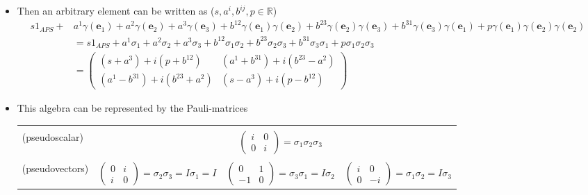 \documentclass[../main.tex]{subfiles}
\begin{document}
\begin{itemize}
\begin{itemize}
\begin{align}
\begin{matrix}
\end{matrix}\right\}\rightarrow\text{Cl}(\textcolor{blue}{0},\textcolor{red}{3})
\end{align}
\item Then an arbitrary element can be written as ($s,a^i,b^{ij},p\in\mathbb{R}$)
\begin{align}
s1_{APS}+&a^1\gamma(\mathbf{e}_1)+a^2\gamma(\mathbf{e}_2)+a^3\gamma(\mathbf{e}_3)
+b^{12}\gamma(\mathbf{e}_1)\gamma(\mathbf{e}_2)
+b^{23}\gamma(\mathbf{e}_2)\gamma(\mathbf{e}_3)
+b^{31}\gamma(\mathbf{e}_3)\gamma(\mathbf{e}_1)
+p\gamma(\mathbf{e}_1)\gamma(\mathbf{e}_2)\gamma(\mathbf{e}_2)\\
&=s1_{APS}+a^1\sigma_1+a^2\sigma_2+a^3\sigma_3
+b^{12}\sigma_1\sigma_2
+b^{23}\sigma_2\sigma_3
+b^{31}\sigma_3\sigma_1
+p\sigma_1\sigma_2\sigma_3\\
&=\left(\begin{matrix}
(s+a^3) +i(p+b^{12}) & (a^1+b^{31})+i(b^{23}-a^2)\\
(a^1-b^{31})+i(b^{23}+a^2) & (s-a^3)+i(p-b^{12})
\end{matrix}
\right)
\end{align}
\item This algebra can be represented by the Pauli-matrices 
\begin{center}
\begin{table}[!h]
\begin{tcolorbox}
\begin{tabular}{lccc}
\shortstack{1 trivector\\ (pseudoscalar)} & &
$\left(\begin{matrix}
i & 0\\
0 & i
\end{matrix}
\right)=\sigma_1\sigma_2\sigma_3$ &\\
\shortstack{3 bivectors\\ (pseudovectors)}
&
$\left(\begin{matrix}
0 & i\\
i & 0
\end{matrix}
\right)=\sigma_2\sigma_3=I\sigma_1=I$
&
$\left(\begin{matrix}
0 & 1\\
-1 & 0
\end{matrix}
\right)=\sigma_3\sigma_1=I\sigma_2$
&
$\left(\begin{matrix}
i & 0\\
0 & -i
\end{matrix}
\right)=\sigma_1\sigma_2=I\sigma_3$\\

\end{tabular}
\end{tcolorbox}
\end{table}
\end{center}
\end{itemize}
\end{itemize}
\end{document}
